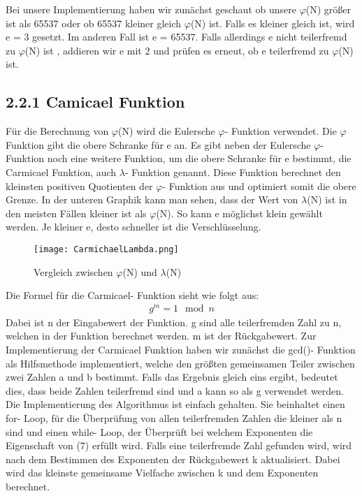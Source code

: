 \documentclass[course=asp]{aspdoc}
\begin{document}
Bei unsere Implementierung haben wir zunächst geschaut ob unsere $\varphi $(N) größer ist als 65537 oder ob 65537 kleiner gleich $\varphi $(N) ist. Falls es kleiner gleich ist, wird e = 3 gesetzt. Im anderen Fall ist e = 65537. Falls allerdings e nicht teilerfremd zu $\varphi $(N) ist , addieren wir e mit 2 und prüfen es erneut, ob e teilerfremd zu $\varphi $(N) ist.
\subsection*{2.2.1 Camicael Funktion} 
Für die Berechnung von $\varphi $(N) wird die Eulersche $\varphi $- Funktion verwendet. Die $\varphi $ Funktion gibt die obere Schranke für e an. Es gibt neben der Eulersche $\varphi $- Funktion noch eine weitere Funktion, um die obere Schranke für e bestimmt, die Carmicael Funktion, auch $\lambda $- Funktion genannt. Diese Funktion berechnet den kleinsten positiven Quotienten der $\varphi $- Funktion aus und optimiert somit die obere Grenze. In der unteren Graphik kann man sehen, dass der Wert von $\lambda $(N) ist in den meisten Fällen kleiner ist als  $\varphi $(N). So kann e möglichst klein gewählt werden. Je kleiner e, desto schneller ist die Verschlüsselung. \cite{Carmicael}
\begin{figure}[h]
\centering
\texttt{[image: CarmichaelLambda.png]}
\caption{Vergleich zwischen $\varphi $(N) und $\lambda $(N)}
\end{figure}

Die Formel für die Carmicael- Funktion sieht wie folgt aus:
\begin{align}
	g^m = 1 \mod n
\end{align} 
Dabei ist n der Eingabewert der Funktion. g sind alle teilerfremden Zahl zu n, welchen in der Funktion berechnet werden. m ist der Rückgabewert. Zur Implementierung der Carmicael Funktion haben wir zunächst die gcd()- Funktion als Hilfsmethode implementiert, welche den größten gemeinsamen Teiler zwischen zwei Zahlen a und b bestimmt. Falls das Ergebnis gleich eins ergibt, bedeutet dies, dass beide Zahlen teilerfremd sind und a kann so als g verwendet werden. Die Implementierung des Algorithmus ist einfach gehalten. Sie beinhaltet einen for- Loop, für die Überprüfung von allen teilerfremden Zahlen die kleiner als n sind und einen while- Loop, der Überprüft bei welchem Exponenten die Eigenschaft von (7) erfüllt wird. Falls eine teilerfremde Zahl gefunden wird, wird nach dem Bestimmen des Exponenten der Rückgabewert k aktualisiert. Dabei wird das kleinste gemeinsame Vielfache zwischen k und dem Exponenten berechnet. 
\end{document}
